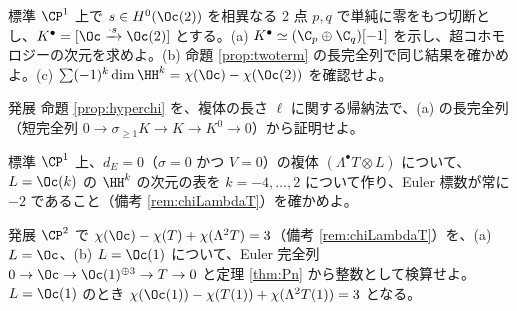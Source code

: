 \begin{prob}{標準}\label{p:hyperSection}
$\CP^1$ 上で $s\in H^0(\Oc(2))$ を相異なる 2 点 $p,q$ で単純に零をもつ切断とし、$K^\bullet=[\Oc\xrightarrow{\cdot s}\Oc(2)]$ とする。(a) $K^\bullet\simeq(\C_p\oplus\C_q)[-1]$ を示し、超コホモロジーの次元を求めよ。(b) 命題 \ref{prop:twoterm} の長完全列で同じ結果を確かめよ。(c) $\sum(-1)^k\dim\HH^k=\chi(\Oc)-\chi(\Oc(2))$ を確認せよ。
\end{prob}
\begin{prob}{発展}\label{p:hyperchiProof}
命題 \ref{prop:hyperchi} を、複体の長さ $\ell$ に関する帰納法で、(a) の長完全列（短完全列 $0\to\sigma_{\ge1}K\to K\to K^0\to0$）から証明せよ。
\end{prob}
\begin{prob}{標準}\label{p:HHP1}
$\CP^1$ 上、$d_E=0$（$\sigma=0$ かつ $V=0$）の複体 $(\Lambda^\bullet T\otimes L)$ について、$L=\Oc(k)$ の $\HH^k$ の次元の表を $k=-4,\dots,2$ について作り、Euler 標数が常に $-2$ であること（備考 \ref{rem:chiLambdaT}）を確かめよ。
\end{prob}
\begin{prob}{発展}\label{p:chiCP2}
$\CP^2$ で $\chi(\Oc)-\chi(T)+\chi(\Lambda^2T)=3$（備考 \ref{rem:chiLambdaT}）を、(a) $L=\Oc$、(b) $L=\Oc(1)$ について、Euler 完全列 $0\to\Oc\to\Oc(1)^{\oplus3}\to T\to0$ と定理 \ref{thm:Pn} から整数として検算せよ。$L=\Oc(1)$ のとき $\chi(\Oc(1))-\chi(T(1))+\chi(\Lambda^2T(1))=3$ となる。
\end{prob}

